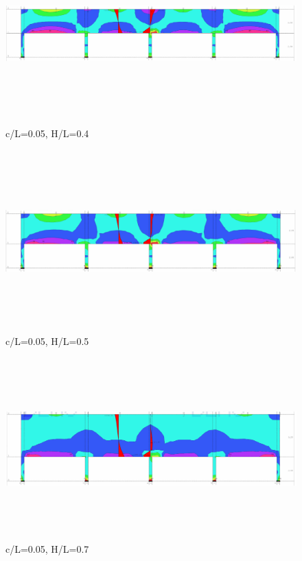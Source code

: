 \documentclass[11pt, a4paper]{article}
\begin{document}
\begin{figure}[H]
	\includegraphics[width=\textwidth, height=7cm]{Slike/C-L_0-05 (0-4).png}
	\caption{c/L=0.05, H/L=0.4}
\end{figure}

\begin{figure}[H]
	\includegraphics[width=\textwidth, height=7cm]{Slike/C-L_0-05 (0-5).png}
	\caption{c/L=0.05, H/L=0.5}
\end{figure}
\newpage
\begin{figure}[H]
	\includegraphics[width=\textwidth, height=7cm]{Slike/C-L_0-05 (0-7).png}
	\caption{c/L=0.05, H/L=0.7}
\end{figure}
\end{document}
